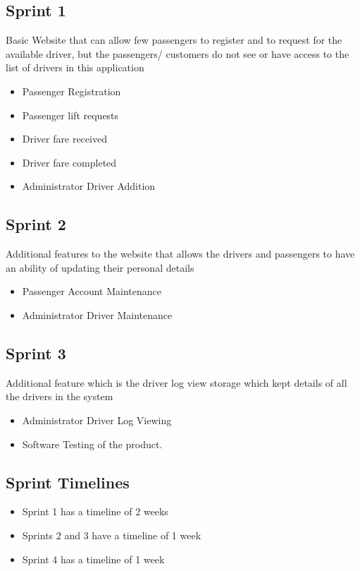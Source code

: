 \documentclass[10pt,twocolumn]{witseiepaper}
\begin{document}
\subsection{Sprint 1}
Basic Website that can allow few passengers to register and to request for the available driver, but the passengers/ customers do not see or have access to the list of drivers in this application 

\begin{itemize}
\item Passenger Registration
\item Passenger lift requests
\item Driver fare received
\item Driver fare completed
\item Administrator Driver Addition
\end{itemize}

\subsection{Sprint 2}
Additional features to the website that allows the drivers and passengers to have an ability of updating their personal details
\begin{itemize}
\item Passenger Account Maintenance
\item Administrator Driver Maintenance 
\end{itemize}

\subsection{Sprint 3}

Additional feature which is the driver log view storage which kept details of all the drivers in the system
\begin{itemize} 
\item Administrator Driver Log Viewing 
\item Software Testing of the product. 
\end{itemize}

\subsection{Sprint Timelines}
\begin{itemize} 
\item Sprint 1 has a timeline of 2 weeks 
\item Sprints 2 and 3 have a timeline of 1 week 
\item Sprint 4 has a timeline of 1 week
\end{itemize}
\end{document}
